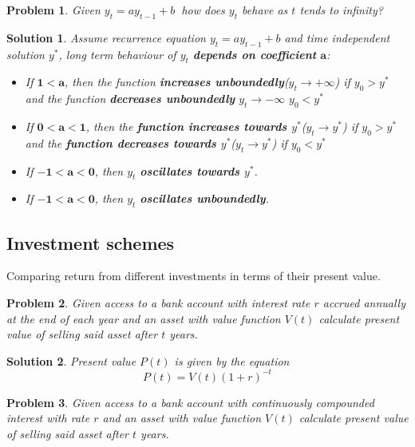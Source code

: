 \documentclass[11pt,a4paper, margin]{article}
\theoremstyle{break}
\newtheorem*{problem}{Problem}
\theoremstyle{break}
\newtheorem*{solution}{Solution}
\begin{document}
\begin{problem}
Given $ y_{t} = ay_{t-1} + b\ $ how does $y_{t}$ behave as $t$ tends to infinity?
\end{problem}

\begin{solution}
Assume recurrence equation $y_{t} = ay_{t-1} + b$ and time independent solution $y^{\ast}$, long term behaviour of $y_{t}$ \textbf{depends on coefficient} $\mathbf{a}$:
\begin{itemize}
	\item If $\mathbf{1 < a}$, then the function \textbf{increases unboundedly}($y_{t} \rightarrow +\infty$) if $y_{0} > y^{\ast}$ and the function \textbf{decreases unboundedly} $y_{t} \rightarrow -\infty$ $y_{0} < y^{\ast}$
	\item If $\mathbf{0 < a < 1}$, then the \textbf{function increases towards $y^{\ast}$}($y_{t} \rightarrow y^{\ast}$) if $y_{0} > y^{\ast}$ and the \textbf{function decreases towards $y^{\ast}$}($y_{t} \rightarrow y^{\ast}$) if $y_{0} < y^{\ast}$
	\item If $\mathbf{-1 < a < 0}$, then $y_{t}$ \textbf{oscillates towards $y^{\ast}$}.
	\item If $\mathbf{-1 < a < 0}$, then $y_{t}$ \textbf{oscillates unboundedly}.
\end{itemize}
\end{solution}

\subsection{Investment schemes}
Comparing return from different investments in terms of their present value.

\begin{problem}
Given access to a bank account with interest rate $r$ accrued annually at the end of each year and an asset with value function $V(t)$ calculate present value of selling said asset after $t$ years.
\end{problem}

\begin{solution}
Present value $P(t)$ is given by the equation \[ P(t) = V(t)(1+r)^{-t} \]
\end{solution}

\begin{problem}
Given access to a bank account with continuously compounded interest with rate $r$ and an asset with value function $V(t)$ calculate present value of selling said asset after $t$ years.
\end{problem}
\end{document}
